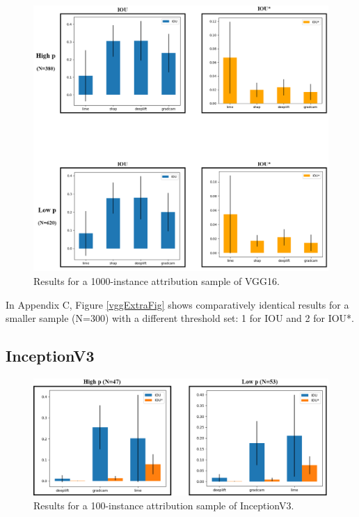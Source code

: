 \documentclass[main]{subfiles}
\begin{document}
\begin{figure}[h]\centering
\vfill
\includegraphics[scale=0.32]{vgg_0_5_and_1.png}
\caption{Results for a 1000-instance attribution sample of VGG16. }
\label{vggAfig}
\vfill
\end{figure}

In Appendix C, Figure \ref{vggExtraFig} shows comparatively identical results for a smaller sample (N=300) with a different threshold set: 1 for IOU and 2 for IOU*.

\newpage


\subsection{InceptionV3}

\begin{figure}[h]
\centering
\includegraphics[scale=0.35]{inception.png}
\caption{Results for a 100-instance attribution sample of InceptionV3. }
\label{inceptionFig}
\end{figure}
\end{document}
